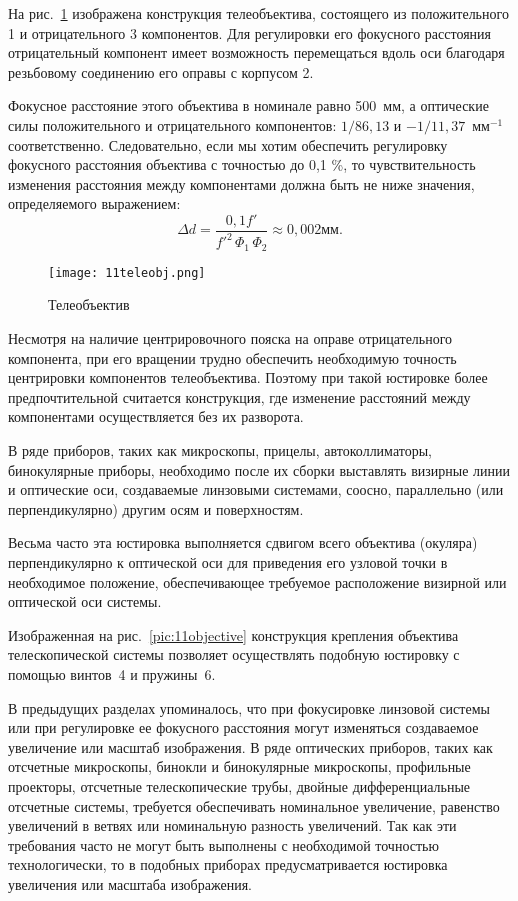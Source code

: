 На рис.~\ref{pic:11teleobj} изображена конструкция телеобъектива, состоящего из положительного 1 и отрицательного 3 компонентов. Для регулировки его фокусного расстояния отрицательный компонент имеет возможность перемещаться вдоль оси благодаря резьбовому соединению его оправы с корпусом 2.

Фокусное расстояние этого объектива в номинале равно 500~мм, а оптические силы положительного и отрицательного компонентов: $ 1/86,13 $ и $ -1/11,37 $~мм$ ^{-1} $ соответственно. Следовательно, если мы хотим обеспечить регулировку фокусного расстояния объектива с точностью до 0,1 \%, то чувствительность изменения расстояния между компонентами должна быть не ниже значения, определяемого выражением:
\[ \Delta d = \dfrac{0,1f'}{f'^2 \, \Phi_1 \, \Phi_2} \approx 0,002 \text{мм}. \]

\begin{figure}[h!]
	\begin{center}
		\caption{ Телеобъектив }
		\texttt{[image: 11teleobj.png]}
		\label{pic:11teleobj}
	\end{center}
\end{figure}

Несмотря на наличие центрировочного пояска на оправе отрицательного компонента, при его вращении трудно обеспечить необходимую точность центрировки компонентов телеобъектива. Поэтому при такой юстировке более предпочтительной считается конструкция, где изменение расстояний между компонентами осуществляется без их разворота. 

В ряде приборов, таких как микроскопы, прицелы, автоколлиматоры, бинокулярные приборы, необходимо после их сборки выставлять визирные линии и оптические оси, создаваемые линзовыми системами, соосно, параллельно (или перпендикулярно) другим осям и поверхностям.

Весьма часто эта юстировка выполняется сдвигом всего объектива (окуляра) перпендикулярно к оптической оси для приведения его узловой точки в необходимое положение, обеспечивающее требуемое расположение визирной или оптической оси системы.

Изображенная на рис.~\ref{pic:11objective} конструкция крепления объектива телескопической системы позволяет осуществлять подобную юстировку с помощью винтов~4 и пружины~6.

В предыдущих разделах упоминалось, что при фокусировке линзовой системы или при регулировке ее фокусного расстояния могут изменяться создаваемое увеличение или масштаб изображения. 
В ряде оптических приборов, таких как отсчетные микроскопы, бинокли и бинокулярные микроскопы, профильные проекторы, отсчетные телескопические трубы, двойные дифференциальные отсчетные системы, требуется обеспечивать номинальное увеличение, равенство увеличений в ветвях или номинальную разность увеличений.
Так как эти требования часто не могут быть выполнены с необходимой точностью технологически, то в подобных приборах предусматривается юстировка увеличения или масштаба изображения.

